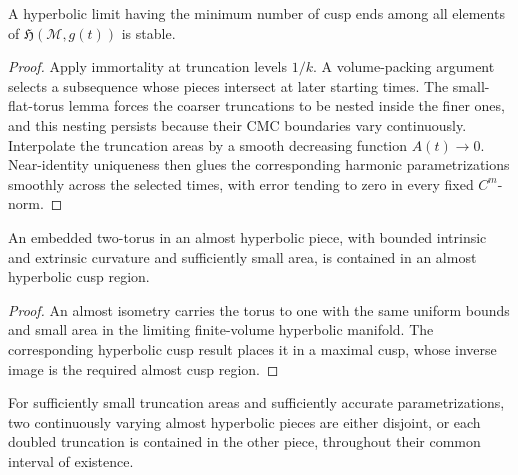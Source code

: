 \begin{theorem}
\label{thm:chow-iv-minimal-cusp-limit-stable}


A hyperbolic limit having the minimum number of cusp ends among all elements of
\(\mathfrak H(\mathcal M,g(t))\) is stable.
\end{theorem}

\begin{proof}
\sketch
Apply immortality at truncation levels \(1/k\).  A volume-packing argument
selects a subsequence whose pieces intersect at later starting times.  The
small-flat-torus lemma forces the coarser truncations to be nested inside the
finer ones, and this nesting persists because their CMC boundaries vary
continuously.  Interpolate the truncation areas by a smooth decreasing function
\(A(t)\to0\).  Near-identity uniqueness then glues the corresponding harmonic
parametrizations smoothly across the selected times, with error tending to zero
in every fixed \(C^m\)-norm.
\end{proof}

\begin{lemma}
\label{lem:chow-iv-small-flat-torus-in-cusp}


An embedded two-torus in an almost hyperbolic piece, with bounded intrinsic and
extrinsic curvature and sufficiently small area, is contained in an almost
hyperbolic cusp region.
\end{lemma}

\begin{proof}
\sketch
An almost isometry carries the torus to one with the same uniform bounds and
small area in the limiting finite-volume hyperbolic manifold.  The
corresponding hyperbolic cusp result places it in a maximal cusp, whose inverse
image is the required almost cusp region.
\end{proof}

\begin{lemma}
\label{lem:chow-iv-almost-hyperbolic-pieces-disjoint}


For sufficiently small truncation areas and sufficiently accurate
parametrizations, two continuously varying almost hyperbolic pieces are either
disjoint, or each doubled truncation is contained in the other piece, throughout
their common interval of existence.
\end{lemma}

